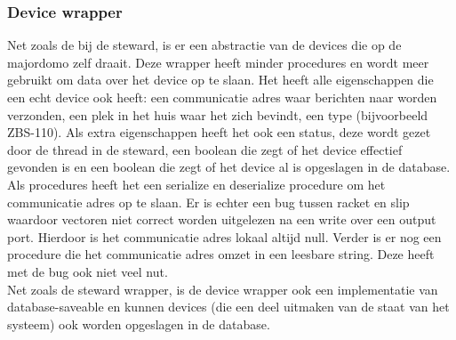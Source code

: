 \documentclass{article}
\begin{document}
\subsubsection{Device wrapper}
\label{ssub:device-wrapper}
Net zoals de bij de steward, is er een abstractie van de devices die op de majordomo zelf draait. Deze wrapper heeft minder procedures en wordt meer gebruikt om data over het device op te slaan. Het heeft alle eigenschappen die een echt device ook heeft: een communicatie adres waar berichten naar worden verzonden, een plek in het huis waar het zich bevindt, een type (bijvoorbeeld ZBS-110). Als extra eigenschappen heeft het ook een status, deze wordt gezet door de thread in de steward, een boolean die zegt of het device effectief gevonden is en een boolean die zegt of het device al is opgeslagen in de database.\\
Als procedures heeft het een serialize en deserialize procedure om het communicatie adres op te slaan. Er is echter een bug tussen racket en slip waardoor vectoren niet correct worden uitgelezen na een write over een output port. Hierdoor is het communicatie adres lokaal altijd null. Verder is er nog een procedure die het communicatie adres omzet in een leesbare string. Deze heeft met de bug ook niet veel nut.\\
Net zoals de steward wrapper, is de device wrapper ook een implementatie van database-saveable en kunnen devices (die een deel uitmaken van de staat van het systeem) ook worden opgeslagen in de database.
\end{document}

